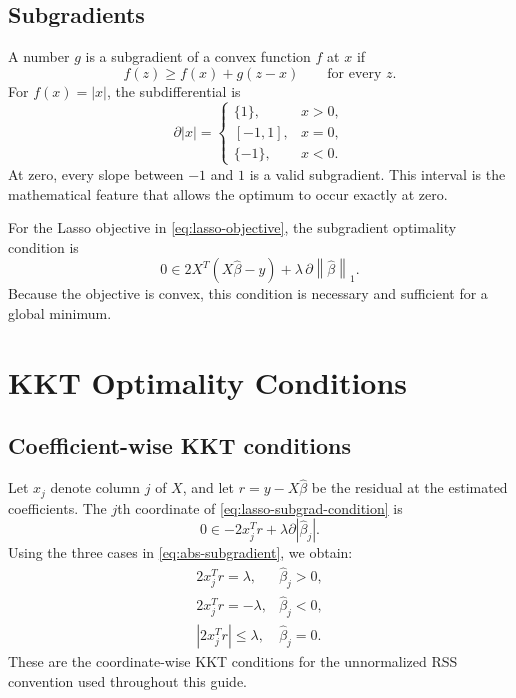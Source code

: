 \documentclass[11pt,a4paper,oneside]{book}
\newcommand{\norm}[1]{\left\lVert #1\right\rVert}
\newcommand{\abs}[1]{\left|#1\right|}
\begin{document}
\section{Subgradients}
A number $g$ is a subgradient of a convex function $f$ at $x$ if
\begin{equation}
  f(z)\geq f(x)+g(z-x)\qquad\text{for every }z.
\end{equation}
For $f(x)=\abs{x}$, the subdifferential is
\begin{equation}
  \boxed{\partial\abs{x}=\begin{cases}
  \{1\},&x>0,\\[-1pt]
  [-1,1],&x=0,\\[-1pt]
  \{-1\},&x<0.
  \end{cases}}
  \label{eq:abs-subgradient}
\end{equation}
At zero, every slope between $-1$ and $1$ is a valid subgradient. This interval is the mathematical feature that allows the optimum to occur exactly at zero.

For the Lasso objective in \cref{eq:lasso-objective}, the subgradient optimality condition is
\begin{equation}
  \boxed{0\in 2X^T(X\hat\beta-y)+\lambda\,\partial\norm{\hat\beta}_1.}
  \label{eq:lasso-subgrad-condition}
\end{equation}
Because the objective is convex, this condition is necessary and sufficient for a global minimum.

\chapter{KKT Optimality Conditions}
\section{Coefficient-wise KKT conditions}
Let $x_j$ denote column $j$ of $X$, and let $r=y-X\hat\beta$ be the residual at the estimated coefficients. The $j$th coordinate of \cref{eq:lasso-subgrad-condition} is
\begin{equation}
  0\in -2x_j^Tr+\lambda\partial\abs{\hat\beta_j}.
\end{equation}
Using the three cases in \cref{eq:abs-subgradient}, we obtain:
\begin{equation}
  \boxed{\begin{array}{ll}
  2x_j^Tr=\lambda,&\hat\beta_j>0,\\[3pt]
  2x_j^Tr=-\lambda,&\hat\beta_j<0,\\[3pt]
  \abs{2x_j^Tr}\leq\lambda,&\hat\beta_j=0.
  \end{array}}
  \label{eq:kkt-piecewise}
\end{equation}
These are the coordinate-wise KKT conditions for the unnormalized RSS convention used throughout this guide.
\end{document}
